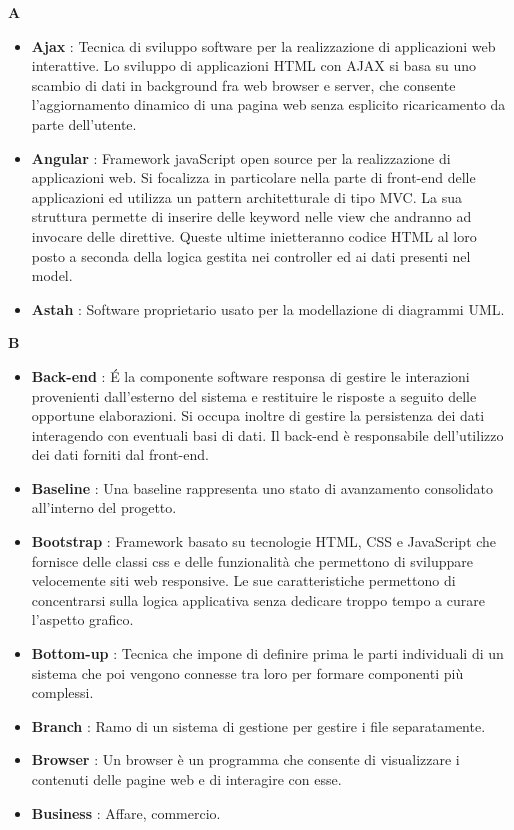 
{\huge \textbf{A}}
\begin{flushleft}
\begin{itemize}[label={}]
\item \textbf{Ajax} : Tecnica di sviluppo software per la realizzazione di applicazioni web interattive. Lo sviluppo di applicazioni HTML con AJAX si basa su uno scambio di dati in background fra web browser e server, che consente l'aggiornamento dinamico di una pagina web senza esplicito ricaricamento da parte dell'utente.
\item \textbf{Angular} : Framework javaScript open source per la realizzazione di applicazioni web. Si focalizza in particolare nella parte di front-end delle applicazioni ed utilizza un pattern architetturale di tipo MVC. La sua struttura permette di inserire delle keyword nelle view che andranno ad invocare delle direttive. Queste ultime inietteranno codice HTML al loro posto a seconda della logica gestita nei controller ed ai dati presenti nel model.
\item \textbf{Astah} : Software proprietario usato per la modellazione di diagrammi UML.
\end{itemize}
\end{flushleft}
\newpage
{\huge \textbf{B}}
\begin{flushleft}
\begin{itemize}[label={}]
\item \textbf{Back-end} : \'E la componente software responsa di gestire le interazioni provenienti dall'esterno del sistema e restituire le risposte a seguito delle opportune elaborazioni. Si occupa inoltre di gestire la persistenza dei dati interagendo con eventuali basi di dati. Il back-end è responsabile dell'utilizzo dei dati forniti dal front-end.
\item \textbf{Baseline} : Una baseline rappresenta uno stato di avanzamento consolidato all'interno del progetto.
\item \textbf{Bootstrap} : Framework basato su tecnologie HTML, CSS e JavaScript che fornisce delle classi css e delle funzionalità che permettono di sviluppare velocemente siti web responsive. Le sue caratteristiche permettono di concentrarsi sulla logica applicativa senza dedicare troppo tempo a curare l'aspetto grafico.
\item \textbf{Bottom-up} : Tecnica che impone di definire prima le parti individuali di un sistema che poi vengono connesse tra loro per formare componenti più complessi.
\item \textbf{Branch} : Ramo di un sistema di gestione per gestire i file separatamente.
\item \textbf{Browser} : Un browser è un programma che consente di visualizzare i contenuti delle pagine web e di interagire con esse.
\item \textbf{Business} : Affare, commercio.
\end{itemize}
\end{flushleft}
